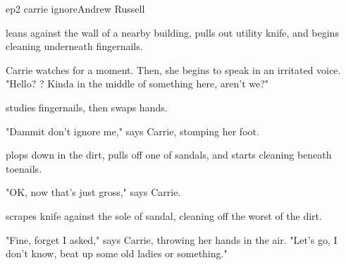 \documentclass{book}
\begin{document}
\begin{childnode}{ep2 carrie ignore}{Andrew Russell}



    \name{} leans against the wall of a nearby building, pulls out \hisher{} utility knife, and begins cleaning underneath \hisher{} fingernails. 

    Carrie watches \name{} for a moment. Then, she begins to speak in an irritated voice. "Hello? \name{}? Kinda in the middle of something here, aren't we?"

    \name{} studies \hisher{} fingernails, then swaps hands.

    "Dammit \name{} don't ignore me," says Carrie, stomping her foot.

    \name{} plops down in the dirt, pulls off one of \hisher{} sandals, and starts cleaning beneath \hisher{} toenails.

    "OK, now that's just gross," says Carrie.

    \name{} scrapes \hisher{} knife against the sole of \hisher{} sandal, cleaning off the worst of the dirt.

    "Fine, forget I asked," says Carrie, throwing her hands in the air. "Let's go, I don't know, beat up some old ladies or something."


\end{childnode}
\end{document}
